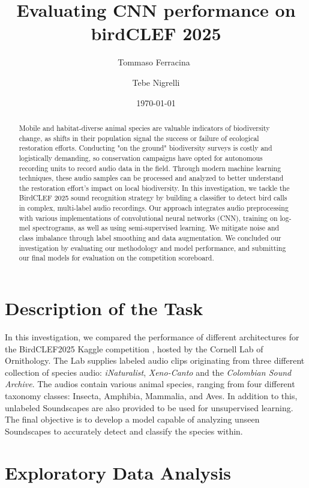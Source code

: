 \documentclass[10pt]{article}
\title{Evaluating CNN performance on birdCLEF 2025}
\author{
  Tommaso Ferracina\
  \and
  Tebe Nigrelli
}
\date{\today}
\begin{document}
\maketitle

\begin{abstract}
  Mobile and habitat-diverse animal species are valuable indicators of biodiversity change, as shifts in their population signal the success or failure of ecological restoration efforts. Conducting "on the ground" biodiversity surveys is costly and logistically demanding, so conservation campaigns have opted for autonomous recording units to record audio data in the field. Through modern machine learning techniques, these audio samples can be processed and analyzed to better understand the restoration effort's impact on local biodiversity. In this investigation, we tackle the BirdCLEF 2025 sound recognition strategy by building a classifier to detect bird calls in complex, multi-label audio recordings. Our approach integrates audio preprocessing with various implementations of convolutional neural networks (CNN), training on log-mel spectrograms, as well as using semi-supervised learning. We mitigate noise and class imbalance through label smoothing and data augmentation. We concluded our investigation by evaluating our methodology and model performance, and submitting our final models for evaluation on the competition scoreboard.
\end{abstract}

\section*{Description of the Task}

In this investigation, we compared the performance of different architectures for the BirdCLEF2025 Kaggle competition \cite{birdclef2025}, hosted by the Cornell Lab of Ornithology. The Lab supplies labeled audio clips originating from three different collection of species audio: \textit{iNaturalist}, \textit{Xeno-Canto} and the \textit{Colombian Sound Archive}. The audios contain various animal species, ranging from four different taxonomy classes: Insecta, Amphibia, Mammalia, and Aves. In addition to this, unlabeled Soundscapes are also provided to be used for unsupervised learning. The final objective is to develop a model capable of analyzing unseen Soundscapes to accurately detect and classify the species within.

\section*{Exploratory Data Analysis}
\end{document}

